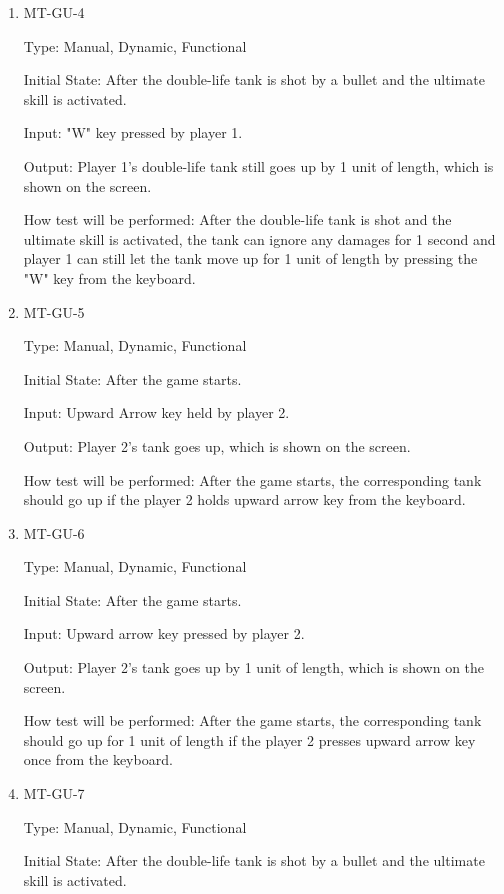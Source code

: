 \documentclass[12pt, titlepage]{article}
\begin{document}
\begin{enumerate}
\item{MT-GU-4\\}

Type: Manual, Dynamic, Functional
					
Initial State: After the double-life tank is shot by a bullet and the ultimate skill is activated.
					
Input: "W" key pressed by player 1.
					
Output: Player 1's double-life tank still goes up by 1 unit of length, which is shown on the screen.
					
How test will be performed: After the double-life tank is shot and the ultimate skill is activated, the tank can ignore any damages for 1 second and player 1 can still let the tank move up for 1 unit of length by pressing the "W" key from the keyboard.

\item{MT-GU-5\\}

Type: Manual, Dynamic, Functional
					
Initial State: After the game starts.
					
Input: Upward Arrow key held by player 2.
					
Output: Player 2's tank goes up, which is shown on the screen.
					
How test will be performed: After the game starts, the corresponding tank should go up if the player 2 holds upward arrow key from the keyboard. 
					
\item{MT-GU-6\\}

Type: Manual, Dynamic, Functional
					
Initial State: After the game starts.
					
Input: Upward arrow key pressed by player 2.
					
Output: Player 2's tank goes up by 1 unit of length, which is shown on the screen.
					
How test will be performed: After the game starts, the corresponding tank should go up for 1 unit of length if the player 2 presses upward arrow key once from the keyboard. 

\item{MT-GU-7\\}

Type: Manual, Dynamic, Functional
					
Initial State: After the double-life tank is shot by a bullet and the ultimate skill is activated.
					

\end{enumerate}
\end{document}
